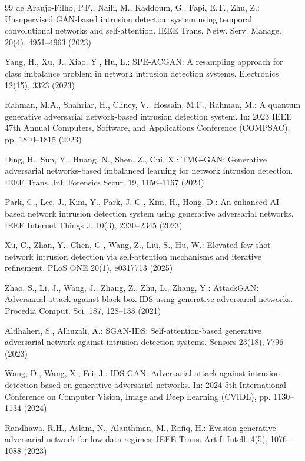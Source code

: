 \documentclass[11pt, a4paper]{article}
\begin{document}
\begin{thebibliography}{99}
de Araujo-Filho, P.F., Naili, M., Kaddoum, G., Fapi, E.T., Zhu, Z.: Unsupervised GAN-based intrusion detection system using temporal convolutional networks and self-attention. IEEE Trans. Netw. Serv. Manage. 20(4), 4951--4963 (2023)

Yang, H., Xu, J., Xiao, Y., Hu, L.: SPE-ACGAN: A resampling approach for class imbalance problem in network intrusion detection systems. Electronics 12(15), 3323 (2023)

Rahman, M.A., Shahriar, H., Clincy, V., Hossain, M.F., Rahman, M.: A quantum generative adversarial network-based intrusion detection system. In: 2023 IEEE 47th Annual Computers, Software, and Applications Conference (COMPSAC), pp. 1810--1815 (2023)

Ding, H., Sun, Y., Huang, N., Shen, Z., Cui, X.: TMG-GAN: Generative adversarial networks-based imbalanced learning for network intrusion detection. IEEE Trans. Inf. Forensics Secur. 19, 1156--1167 (2024)

Park, C., Lee, J., Kim, Y., Park, J.-G., Kim, H., Hong, D.: An enhanced AI-based network intrusion detection system using generative adversarial networks. IEEE Internet Things J. 10(3), 2330--2345 (2023)

Xu, C., Zhan, Y., Chen, G., Wang, Z., Liu, S., Hu, W.: Elevated few-shot network intrusion detection via self-attention mechanisms and iterative refinement. PLoS ONE 20(1), e0317713 (2025)

Zhao, S., Li, J., Wang, J., Zhang, Z., Zhu, L., Zhang, Y.: AttackGAN: Adversarial attack against black-box IDS using generative adversarial networks. Procedia Comput. Sci. 187, 128--133 (2021)

Aldhaheri, S., Alhuzali, A.: SGAN-IDS: Self-attention-based generative adversarial network against intrusion detection systems. Sensors 23(18), 7796 (2023)

Wang, D., Wang, X., Fei, J.: IDS-GAN: Adversarial attack against intrusion detection based on generative adversarial networks. In: 2024 5th International Conference on Computer Vision, Image and Deep Learning (CVIDL), pp. 1130--1134 (2024)

Randhawa, R.H., Aslam, N., Alauthman, M., Rafiq, H.: Evasion generative adversarial network for low data regimes. IEEE Trans. Artif. Intell. 4(5), 1076--1088 (2023)


\end{thebibliography}
\end{document}
